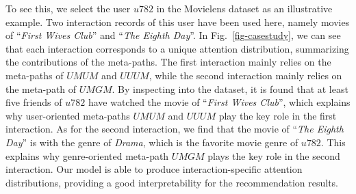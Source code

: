 To see this, we select the user $u782$ in the Movielens dataset as an illustrative example. Two interaction records of  this user have been used here, namely movies of ``\emph{First Wives Club}'' and ``\emph{The Eighth Day}''. In Fig.~\ref{fig-casestudy}, we can see that each interaction corresponds to a unique attention distribution, summarizing the contributions of the meta-paths. The first interaction mainly relies on the meta-paths of $UMUM$ and $UUUM$, while the second interaction mainly relies on the meta-path of $UMGM$. By inspecting into the dataset, it is found that at least five friends of $u782$ have watched the movie of ``\emph{First Wives Club}'', which explains why user-oriented meta-paths  $UMUM$ and $UUUM$ play the key role in the first interaction. As for the second interaction, we find that the movie of ``\emph{The Eighth Day}'' is with the genre of \emph{Drama}, which is the favorite movie genre of $u782$. This explains why genre-oriented meta-path $UMGM$ plays the key role in the second interaction.
Our model is able to produce interaction-specific attention distributions, providing a good interpretability for the recommendation results.


